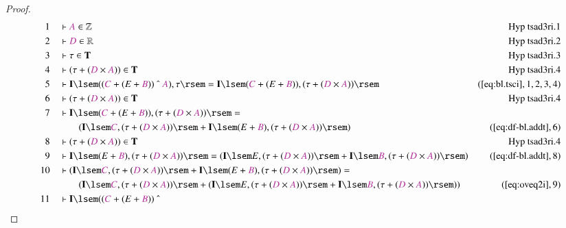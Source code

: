 \begin{proof}
\begin{align}
  1 &&  & \vdash \mc{A} \in \mathbb{Z}&\text{Hyp~tsad3ri.1}\notag%
  \\ 2 &&  & \vdash \mc{D} \in
      \mathbb{R}&\text{Hyp~tsad3ri.2}\notag%
  \\ 3 &&  & \vdash \tau \in \mathbf{T}&\text{Hyp~tsad3ri.3}\notag%
  \\ 4 &&  & \vdash ( \tau + ( \mc{D} \times \mc{A} ) ) \in
      \mathbf{T}&\text{Hyp~tsad3ri.4}\notag%
  \\ 5 &&  & \vdash \mathbf{I} \lsem ( ( \mc{C} + ( E + \mc{B} ) ) ~\string^~
      \mc{A} ) , \tau \rsem = \mathbf{I} \lsem ( \mc{C} + (
      E + \mc{B} ) ) , ( \tau + ( \mc{D} \times \mc{A} ) )
      \rsem&(\mbox{\ref{eq:bl.tsci}},1,2,3,4)\notag
  \\ 6 &&  & \vdash ( \tau + ( \mc{D} \times \mc{A} ) ) \in
      \mathbf{T}&\text{Hyp~tsad3ri.4}\notag%
  \\ 7 &&  & \vdash \mathbf{I} \lsem ( \mc{C} + ( E + \mc{B} ) ) , ( \tau + (
      \mc{D} \times \mc{A} ) ) \rsem =  \notag \\ & & & \qquad
     ( \mathbf{I} \lsem
      \mc{C} , ( \tau + ( \mc{D} \times \mc{A} ) ) \rsem +
      \mathbf{I} \lsem ( E + \mc{B} ) , ( \tau + ( \mc{D}
      \times \mc{A} ) ) \rsem
      )&(\mbox{\ref{eq:df-bl.addt}},6)\notag
  \\ 8 &&  & \vdash ( \tau + ( \mc{D} \times \mc{A} ) ) \in
      \mathbf{T}&\text{Hyp~tsad3ri.4}\notag%
  \\ 9 &&  & \vdash \mathbf{I} \lsem ( E + \mc{B} ) , ( \tau + ( \mc{D} \times
      \mc{A} ) ) \rsem = ( \mathbf{I} \lsem E , ( \tau + (
      \mc{D} \times \mc{A} ) ) \rsem + \mathbf{I} \lsem
      \mc{B} , ( \tau + ( \mc{D} \times \mc{A} ) ) \rsem
      )&(\mbox{\ref{eq:df-bl.addt}},8)\notag
  \\ 10 &&  & \vdash ( \mathbf{I} \lsem \mc{C} , ( \tau + ( \mc{D} \times \mc{A}
      ) ) \rsem + \mathbf{I} \lsem ( E + \mc{B} ) , ( \tau
      + ( \mc{D} \times \mc{A} ) ) \rsem ) =  \notag \\ & & & \qquad
     ( \mathbf{I}
      \lsem \mc{C} , ( \tau + ( \mc{D} \times \mc{A} ) )
      \rsem + ( \mathbf{I} \lsem E , ( \tau + ( \mc{D}
      \times \mc{A} ) ) \rsem + \mathbf{I} \lsem \mc{B} , (
      \tau + ( \mc{D} \times \mc{A} ) ) \rsem )
      )&(\mbox{\ref{eq:oveq2i}},9)\notag
  \\ 11 &&  & \vdash \mathbf{I} \lsem ( ( \mc{C} + ( E + \mc{B} ) ) ~\string^~

\end{align}
\end{proof}
